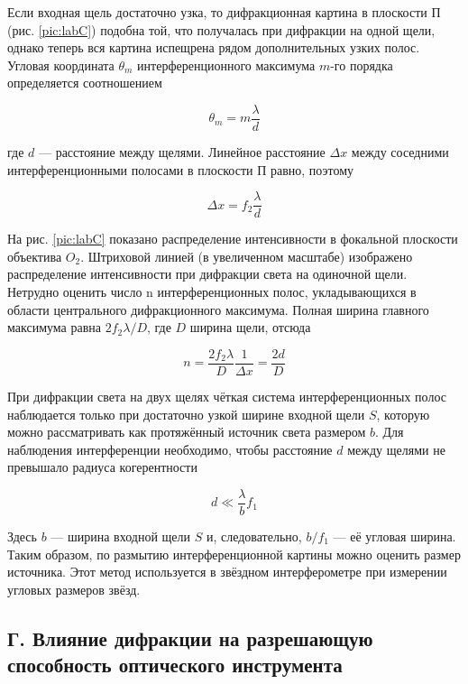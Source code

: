 \documentclass[12pt, a4paper]{article}
\begin{document}
Если входная щель достаточно узка, то дифракционная картина
в плоскости П (рис. \ref{pic:labC}) подобна той, что получалась при дифракции
на одной щели, однако теперь вся картина испещрена рядом дополнительных узких полос.
Угловая координата $ \theta_m $ интерференционного максимума $ m $-го порядка определяется соотношением

\begin{equation}\label{}
  \theta_m = m \dfrac{\lambda}{d}
\end{equation}

где $ d $ --- расстояние между щелями. Линейное расстояние $ \Delta x $ между соседними интерференционными полосами в плоскости П равно, поэтому

\begin{equation}\label{dx}
  \Delta x = f_2 \dfrac{\lambda}{d}
\end{equation}

На рис. \ref{pic:labC} показано распределение интенсивности в фокальной плоскости объектива $ O_2 $. Штриховой линией (в увеличенном масштабе)
изображено распределение интенсивности при дифракции света на одиночной щели. Нетрудно оценить число n интерференционных полос,
укладывающихся в области центрального дифракционного максимума.
Полная ширина главного максимума равна $ 2 f_2 \lambda /D $, где $ D $ ширина щели, отсюда

\begin{equation}\label{n}
  n = \dfrac{2f_2 \lambda}{D} \dfrac{1}{\Delta x} = \dfrac{2d}{D}
\end{equation}

При дифракции света на двух щелях чёткая система интерференционных полос наблюдается только при достаточно узкой ширине входной щели $ S $, которую можно рассматривать как протяжённый источник света размером $ b $. Для наблюдения интерференции необходимо, чтобы расстояние $ d $ между щелями не превышало радиуса когерентности

\begin{equation}\label{}
  d \ll \dfrac{\lambda}{b} f_1
\end{equation}

Здесь $ b $ --- ширина входной щели $ S $ и, следовательно, $  b/f_1 $ --- её угловая ширина. Таким образом, по размытию интерференционной картины можно оценить размер источника. Этот метод используется в звёздном интерферометре при измерении угловых размеров звёзд.

\subsection*{Г. Влияние дифракции на разрешающую способность оптического инструмента}
\end{document}
